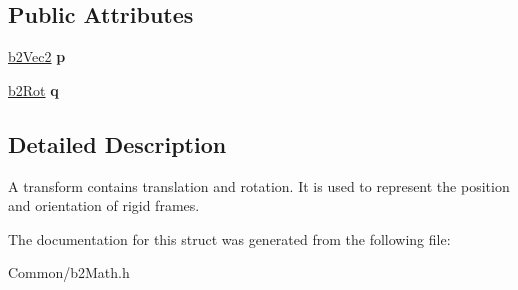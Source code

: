 \subsection*{Public Attributes}
\begin{DoxyCompactItemize}
\item 
\mbox{\label{structb2Transform_a9eeeb643a016c29a4d389e480ba6c628}} 
\mbox{\hyperlink{structb2Vec2}{b2\+Vec2}} {\bfseries p}
\item 
\mbox{\label{structb2Transform_ae4aaac23f32686e165138c4e5dc4ce85}} 
\mbox{\hyperlink{structb2Rot}{b2\+Rot}} {\bfseries q}
\end{DoxyCompactItemize}


\subsection{Detailed Description}
A transform contains translation and rotation. It is used to represent the position and orientation of rigid frames. 

The documentation for this struct was generated from the following file\+:\begin{DoxyCompactItemize}
\item 
Common/b2\+Math.\+h\end{DoxyCompactItemize}
